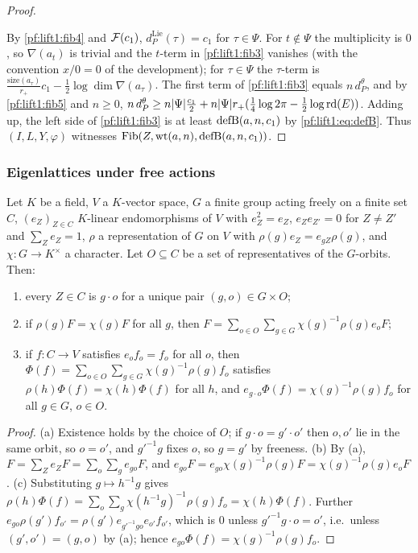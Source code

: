 \begin{proof}
\begin{enumerate}[label=(\roman*)]
\end{enumerate}
By \ref{pf:lift1:fib4} and $\mathcal F(c_1)$, $d^{\mathrm{Lie}}_P(\tau)=c_1$ for $\tau\in\Psi$.
For $t\notin\Psi$ the multiplicity is $0$, so $\nabla(a_t)$ is trivial and the $t$-term in
\ref{pf:lift1:fib3} vanishes (with the convention $x/0=0$ of the development); for $\tau\in\Psi$ the
$\tau$-term is
$\frac{\mathrm{size}(a_\tau)}{r_+}c_1-\frac12\log\dim\nabla(a_\tau)$. The first term of
\ref{pf:lift1:fib3} equals $n\,d^{\theta}_P$, and by \ref{pf:lift1:fib5} and $n\ge0$,
$n\,d^{\theta}_P\ge n|\Psi|\frac{c_1}2+n|\Psi|r_+(\frac14\log2\pi-\frac12\log\mathrm{rd}(E))$.
Adding up, the left side of \ref{pf:lift1:fib3} is at least $\mathrm{defB}(a,n,c_1)$
by \eqref{pf:lift1:eq:defB}. Thus $(I,L,Y,\varphi)$ witnesses
$\mathrm{Fib}(Z,\mathrm{wt}(a,n),\mathrm{defB}(a,n,c_1))$.
\end{proof}

\subsubsection*{Eigenlattices under free actions}

\begin{lemma}\label{pf:lift1:orbit}
Let $K$ be a field, $V$ a $K$-vector space, $G$ a finite group acting freely on a finite set $C$,
$(e_Z)_{Z\in C}$ $K$-linear endomorphisms of $V$ with $e_Z^2=e_Z$, $e_Ze_{Z'}=0$ for $Z\ne Z'$ and
$\sum_Ze_Z=1$, $\rho$ a representation of $G$ on $V$ with $\rho(g)e_Z=e_{gZ}\rho(g)$, and
$\chi\colon G\to K^\times$ a character. Let $O\subseteq C$ be a set of representatives of the
$G$-orbits. Then:
\begin{enumerate}[label=(\alph*)]
\item every $Z\in C$ is $g\cdot o$ for a unique pair $(g,o)\in G\times O$;
\item if $\rho(g)F=\chi(g)F$ for all $g$, then $F=\sum_{o\in O}\sum_{g\in G}\chi(g)^{-1}\rho(g)e_oF$;
\item if $f\colon C\to V$ satisfies $e_of_o=f_o$ for all $o$, then
  $\Phi(f)=\sum_{o\in O}\sum_{g\in G}\chi(g)^{-1}\rho(g)f_o$ satisfies $\rho(h)\Phi(f)=\chi(h)\Phi(f)$ for
  all $h$, and $e_{g\cdot o}\Phi(f)=\chi(g)^{-1}\rho(g)f_o$ for all $g\in G$, $o\in O$.
\end{enumerate}
\end{lemma}

\begin{proof}
(a) Existence holds by the choice of $O$; if $g\cdot o=g'\cdot o'$ then $o,o'$ lie in the same orbit, so
$o=o'$, and $g'^{-1}g$ fixes $o$, so $g=g'$ by freeness. (b) By (a),
$F=\sum_Ze_ZF=\sum_{o}\sum_ge_{go}F$, and
$e_{go}F=e_{go}\chi(g)^{-1}\rho(g)F=\chi(g)^{-1}\rho(g)e_oF$. (c) Substituting $g\mapsto h^{-1}g$ gives
$\rho(h)\Phi(f)=\sum_o\sum_g\chi(h^{-1}g)^{-1}\rho(g)f_o=\chi(h)\Phi(f)$. Further
$e_{go}\rho(g')f_{o'}=\rho(g')e_{g'^{-1}go}e_{o'}f_{o'}$, which is $0$ unless $g'^{-1}g\cdot o=o'$, i.e.\
unless $(g',o')=(g,o)$ by (a); hence $e_{go}\Phi(f)=\chi(g)^{-1}\rho(g)f_o$.
\end{proof}

